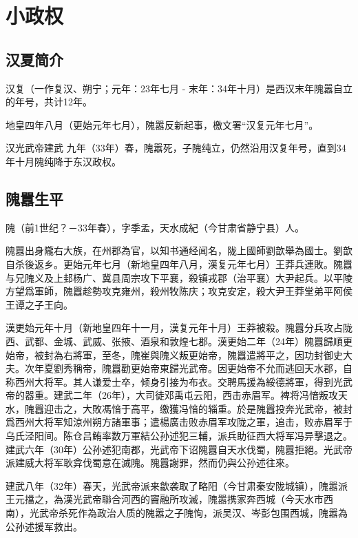 
\section{小政权}

\subsection{汉夏简介}

汉复（一作复汉、朔宁；元年：23年七月 - 末年：34年十月）是西汉末年隗嚣自立的年号，共计12年。

地皇四年八月（更始元年七月），隗嚣反新起事，檄文署“汉复元年七月”。

汉光武帝建武 九年（33年）春，隗嚣死，子隗纯立，仍然沿用汉复年号，直到34年十月隗纯降于东汉政权。

\subsection{隗囂生平}

隗（前1世纪？－33年春），字季孟，天水成紀（今甘肃省静宁县）人。

隗囂出身隴右大族，在州郡為官，以知书通经闻名，陇上國師劉歆舉為國士。劉歆自杀後返乡。更始元年七月（新地皇四年八月，漢复元年七月）王莽兵連敗。隗囂与兄隗义及上邽杨广、冀县周宗攻下平襄，殺镇戎郡（治平襄）大尹起兵。以平陵方望爲軍師，隗囂趁勢攻克雍州，殺州牧陈庆；攻克安定，殺大尹王莽堂弟平阿侯王谭之子王向。

漢更始元年十月（新地皇四年十一月，漢复元年十月）王莽被殺。隗囂分兵攻占陇西、武都、金城、武威、张掖、酒泉和敦煌七郡。漢更始二年（24年）隗囂歸順更始帝，被封為右將軍，至冬，隗崔與隗义叛更始帝，隗囂遣將平之，因功封御史大夫。次年夏劉秀稱帝，隗囂勸更始帝東歸光武帝。因更始帝不允而逃回天水郡，自称西州大将军。其人谦爱士卒，倾身引接为布衣。交聘馬援為綏德將軍，得到光武帝的器重。建武二年（26年），大司徒邓禹屯云阳，西击赤眉军。裨将冯愔叛攻天水，隗囂迎击之，大敗馮愔于高平，缴獲冯愔的辎重。於是隗囂投奔光武帝，被封爲西州大将军知涼州朔方諸軍事；遣楊廣击败赤眉军攻陇之軍，追击，败赤眉军于乌氏泾阳间。陈仓吕鲔率数万軍結公孙述犯三輔，派兵助征西大将军冯异擊退之。建武六年（30年）公孙述犯南郡，光武帝下诏隗囂自天水伐蜀，隗囂拒絕。光武帝派建威大将军耿弇伐蜀意在滅隗。隗囂謝罪，然而仍與公孙述往來。

建武八年（32年）春天，光武帝派来歙袭取了略阳（今甘肃秦安陇城镇），隗嚣派王元擋之，為漢光武帝聯合河西的竇融所攻滅，隗嚣携家奔西城（今天水市西南），光武帝杀死作為政治人质的隗嚣之子隗恂，派吴汉、岑彭包围西城，隗嚣為公孙述援军救出。

